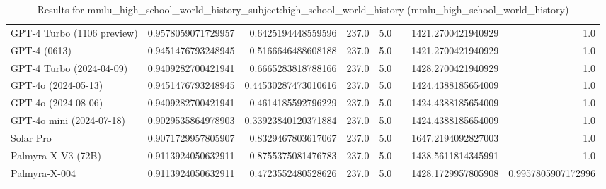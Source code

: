\begin{table}[htp]
{\begin{tabular}{lrrrrrrr}
GPT-4 Turbo (1106 preview) & 0.9578059071729957 & 0.6425194448559596 & 237.0 & 5.0 &  & 1421.2700421940929 & 1.0 \\
GPT-4 (0613) & 0.9451476793248945 & 0.5166646488608188 & 237.0 & 5.0 &  & 1421.2700421940929 & 1.0 \\
GPT-4 Turbo (2024-04-09) & 0.9409282700421941 & 0.6665283818788166 & 237.0 & 5.0 &  & 1428.2700421940929 & 1.0 \\
GPT-4o (2024-05-13) & 0.9451476793248945 & 0.44530287473010616 & 237.0 & 5.0 &  & 1424.4388185654009 & 1.0 \\
GPT-4o (2024-08-06) & 0.9409282700421941 & 0.4614185592796229 & 237.0 & 5.0 &  & 1424.4388185654009 & 1.0 \\
GPT-4o mini (2024-07-18) & 0.9029535864978903 & 0.33923840120371884 & 237.0 & 5.0 &  & 1424.4388185654009 & 1.0 \\
Solar Pro & 0.9071729957805907 & 0.8329467803617067 & 237.0 & 5.0 &  & 1647.2194092827003 & 1.0 \\
Palmyra X V3 (72B) & 0.9113924050632911 & 0.8755375081476783 & 237.0 & 5.0 &  & 1438.5611814345991 & 1.0 \\
Palmyra-X-004 & 0.9113924050632911 & 0.4723552480528626 & 237.0 & 5.0 &  & 1428.1729957805908 & 0.9957805907172996 \\
\bottomrule
\end{tabular}}
\caption{Results for mmlu_high_school_world_history_subject:high_school_world_history (mmlu_high_school_world_history)}
\label{fig:mmlu_high_school_world_history_subject:high_school_world_history (mmlu_high_school_world_history)}
\end{table}